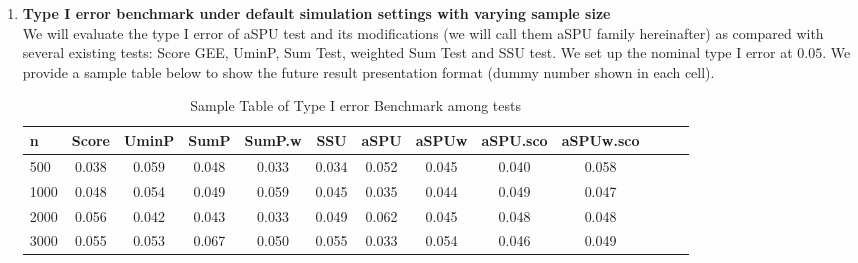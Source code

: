 \documentclass[12pt]{article}
\begin{document}
\begin{enumerate}
\item \textbf{Type I error benchmark under default simulation settings with varying sample size}\\
We will evaluate the type I error of aSPU test and its modifications (we will call them aSPU family hereinafter) as compared with several existing tests: Score GEE, UminP, Sum Test, weighted Sum Test and SSU test. We set up the nominal type I error at $0.05$. We provide a sample table below to show the future result presentation format (dummy number shown in each cell).
\begin{center}
\small
\begin{table}[H]
\begin{tabular}{lcccccccccccc}
\hline 
n & Score & UminP & SumP & SumP.w & SSU & aSPU & aSPUw & aSPU.sco & aSPUw.sco \\ 
\hline 
500 & 0.038 & 0.059 & 0.048 & 0.033 & 0.034 & 0.052 & 0.045 & 0.040 & 0.058 \\ 
1000 & 0.048 & 0.054 & 0.049 & 0.059 & 0.045 & 0.035 & 0.044 & 0.049 & 0.047 \\ 
2000 & 0.056 & 0.042 & 0.043 & 0.033 & 0.049 & 0.062 & 0.045 & 0.048 & 0.048 \\ 
3000 & 0.055 & 0.053 & 0.067 & 0.050 & 0.055 & 0.033 & 0.054 & 0.046 & 0.049 \\ 
\hline 
\end{tabular}
\caption{Sample Table of Type I error Benchmark among tests}
\label{table:type_I_error_CV_varySampleSize}
\end{table}
\end{center}



\end{enumerate}
\end{document}
